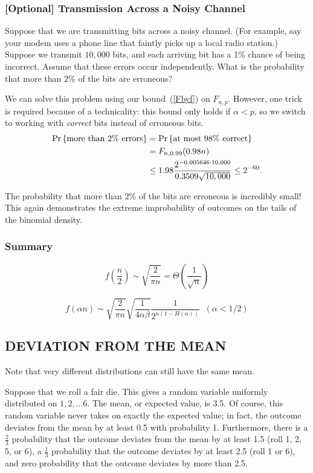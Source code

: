 \documentclass[11pt,twoside]{article}
\begin{document}
\subsubsection{[Optional] Transmission Across a Noisy Channel}
\begin{optional}

Suppose that we are transmitting bits across a noisy channel.  (For
example, say your modem uses a phone line that faintly picks up a local
radio station.)  Suppose we transmit $10,000$ bits, and each arriving bit
has a 1\% chance of being incorrect.  Assume that these errors occur
independently.  What is the probability that more than $2\%$ of the bits
are erroneous?

We can solve this problem using our bound~(\ref{Fbyf}) on $F_{n,p}$.
However, one trick is required because of a technicality: this bound only
holds if $\alpha < p$, so we switch to working with \emph{correct} bits
instead of erroneous bits.
\begin{align*}
\mathop{\textup{Pr}}\nolimits\left\{\mbox{more than 2\% errors}\right\} &  =  \mathop{\textup{Pr}}\nolimits\left\{\mbox{at most 98\% correct}\right\}\\
  &  =  F_{n, 0.99}(0.98n)\\
  & \leq  1.98 \frac{2^{-0.005646 \cdot 10,000}}{0.3509 \sqrt{10,000}} \leq  2^{-60}.
\end{align*}

The probability that more than 2\% of the bits are erroneous is
incredibly small!  This again demonstrates the extreme improbability
of outcomes on the tails of the binomial density.

\end{optional}

\iffalse
\subsubsection{Summary}
\[
f(\frac{n}{2}) \sim \sqrt{\frac{2}{\pi n}} = \Theta(\frac{1}{\sqrt{n}})
\]

\[
f(\alpha n) \sim \sqrt{\frac{2}{\pi n}}\sqrt{\frac{1}{4\alpha\beta }}\frac{1}{2^{n(1 - H(\alpha))}}
\;\; (\alpha < 1/2)
\]


\subsection{DEVIATION FROM THE MEAN}

Note that very different distributions can still have the same mean.

\begin{example}
  Suppose that we roll a fair die.  This gives a random variable
  uniformly distributed on $1, 2, \ldots 6$.  The mean, or expected
  value, is 3.5.  Of course, this random variable never takes on
  exactly the expected value; in fact, the outcome deviates from the
  mean by at least 0.5 with probability 1.  Furthermore, there is a
  $\frac{2}{3}$ probability that the outcome deviates from the mean by
  at least 1.5 (roll 1, 2, 5, or 6), a $\frac{1}{3}$ probability that
  the outcome deviates by at least 2.5 (roll 1 or 6), and zero
  probability that the outcome deviates by more than 2.5.
\end{example}
\end{document}
